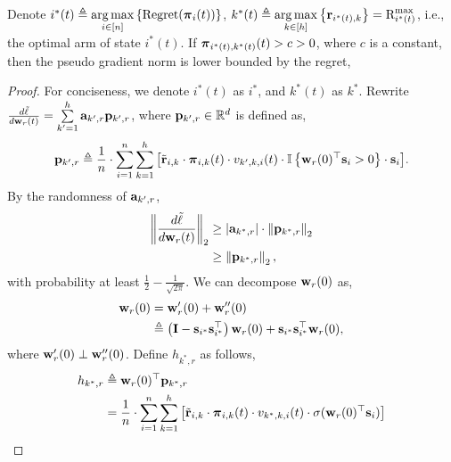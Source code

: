 \documentclass[10pt]{article}
\DeclareMathOperator*{\argmax}{arg\,max}
\begin{document}
\begin{lem}
	Denote $i^*(t) \triangleq \argmax\limits_{i \in [n]}\left\{\regret(\rvpi_i(t))\right\}$, $k^*(t) \triangleq \argmax\limits_{k \in [h]}\left\{ \rvr_{i^*(t),k} \right\} = \r_{i^*(t)}^{\max}$, i.e., the optimal arm of state $i^*(t)$. If ${\boldsymbol{\pi}}_{i^*(t), k^*(t)}(t) > c > 0$, where $c$ is a constant, then the pseudo gradient norm is lower bounded by the regret,
\end{lem}
\begin{proof}
	 For conciseness, we denote $i^*(t)$ as $i^*$, and $k^*(t)$ as $k^*$. Rewrite $\frac{d\tilde{\ell}}{d {\mathbf{w}}_r(t)} = \sum\limits_{k^
	\prime=1}^{h}{ {\mathbf{a}}_{k^\prime,r} {\mathbf{p}}_{k^\prime, r} }$, where ${\mathbf{p}}_{k^\prime, r} \in {\mathbb{R}}^d$ is defined as, 
\begin{equation*}
	{\mathbf{p}}_{k^\prime, r} \triangleq \frac{1}{n} \cdot \sum\limits_{i=1}^{n}{ \sum\limits_{k=1}^{h}{ \left[ {\tilde{\mathbf{r}}}_{i,k} \cdot {\boldsymbol{\pi}}_{i,k}(t) \cdot v_{k^\prime,k,i}(t) \cdot {\mathbb{I}}\left\{ {\mathbf{w}}_r(0)^\top {\mathbf{s}}_i > 0 \right\} \cdot {\mathbf{s}}_i \right] } }.
\end{equation*}
By the randomness of ${\mathbf{a}}_{k^\prime,r}$,
\begin{equation*}
\begin{split}
	\left\| \frac{d\tilde{\ell}}{d {\mathbf{w}}_r(t)} \right\|_2 &\ge \left| {\mathbf{a}}_{k^*,r} \right| \cdot \left\| {\mathbf{p}}_{k^*, r}\right\|_2 \\
	&\ge \left\| {\mathbf{p}}_{k^*, r}\right\|_2,
\end{split}
\end{equation*}
with probability at least $\frac{1}{2} - \frac{1}{\sqrt{2\pi}}$. We can decompose ${\mathbf{w}}_r(0)$ as,
\begin{equation}
\label{eq:decompose_w}
\begin{split}
	{\mathbf{w}}_r(0) &= {\mathbf{w}}_r^\prime(0) + {\mathbf{w}}_r^{\prime\prime}(0) \\
	&\triangleq \left( {\mathbf{I}} - {\mathbf{s}}_{i^*}{\mathbf{s}}_{i^*}^\top \right) {\mathbf{w}}_r(0) +  {\mathbf{s}}_{i^*}{\mathbf{s}}_{i^*}^\top {\mathbf{w}}_r(0),
\end{split}
\end{equation}
where ${\mathbf{w}}_r^\prime(0) \perp {\mathbf{w}}_r^{\prime\prime}(0)$. Define $h_{k^*,r}$ as follows,
\begin{equation*}
\begin{split}
	h_{k^*,r} &\triangleq \rvw_r(0)^\top \rvp_{k^*, r} \\
	&= \frac{1}{n} \cdot \sum\limits_{i=1}^{n}{ \sum\limits_{k=1}^{h}{ \left[ \rvtilder_{i,k} \cdot \rvpi_{i,k}(t) \cdot v_{k^*,k,i}(t) \cdot \sigma( \rvw_r(0)^\top \rvs_i ) \right] } }

\end{split}
\end{equation*}
\end{proof}
\end{document}
